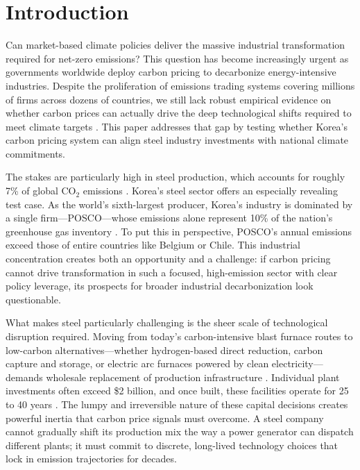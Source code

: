 \section{Introduction}

Can market-based climate policies deliver the massive industrial transformation required for net-zero emissions? This question has become increasingly urgent as governments worldwide deploy carbon pricing to decarbonize energy-intensive industries. Despite the proliferation of emissions trading systems covering millions of firms across dozens of countries, we still lack robust empirical evidence on whether carbon prices can actually drive the deep technological shifts required to meet climate targets \citep{Green2021}. This paper addresses that gap by testing whether Korea's carbon pricing system can align steel industry investments with national climate commitments.

The stakes are particularly high in steel production, which accounts for roughly 7\% of global CO$_2$ emissions \citep{worldsteel2022}. Korea's steel sector offers an especially revealing test case. As the world's sixth-largest producer, Korea's industry is dominated by a single firm—POSCO—whose emissions alone represent 10\% of the nation's greenhouse gas inventory \citep{KOSIS2023}. To put this in perspective, POSCO's annual emissions exceed those of entire countries like Belgium or Chile. This industrial concentration creates both an opportunity and a challenge: if carbon pricing cannot drive transformation in such a focused, high-emission sector with clear policy leverage, its prospects for broader industrial decarbonization look questionable.

What makes steel particularly challenging is the sheer scale of technological disruption required. Moving from today's carbon-intensive blast furnace routes to low-carbon alternatives—whether hydrogen-based direct reduction, carbon capture and storage, or electric arc furnaces powered by clean electricity—demands wholesale replacement of production infrastructure \citep{IEA2020steel}. Individual plant investments often exceed \$2 billion, and once built, these facilities operate for 25 to 40 years \citep{MaterialEconomics2019}. The lumpy and irreversible nature of these capital decisions creates powerful inertia that carbon price signals must overcome. A steel company cannot gradually shift its production mix the way a power generator can dispatch different plants; it must commit to discrete, long-lived technology choices that lock in emission trajectories for decades.

